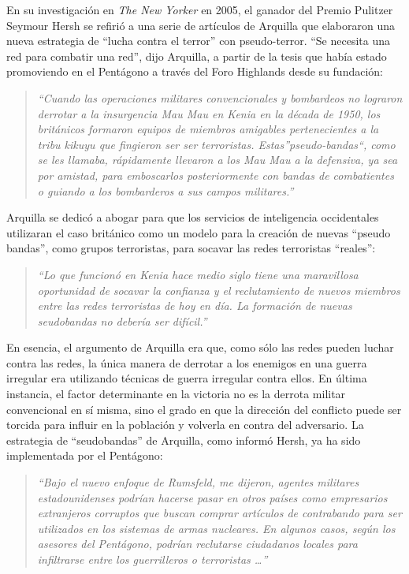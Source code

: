\documentclass[10pt,a5paper,twoside,spanish,]{book}
\begin{document}
En su investigación en \emph{The New Yorker} en 2005, el ganador del
Premio Pulitzer Seymour Hersh se refirió a una serie de artículos de
Arquilla que elaboraron una nueva estrategia de ``lucha contra el
terror'' con pseudo-terror. ``Se necesita una red para combatir una
red'', dijo Arquilla, a partir de la tesis que había estado promoviendo
en el Pentágono a través del Foro Highlands desde su fundación:

\begin{quote}
\emph{``Cuando las operaciones militares convencionales y bombardeos no
lograron derrotar a la insurgencia Mau Mau en Kenia en la década de
1950, los británicos formaron equipos de miembros amigables
pertenecientes a la tribu kikuyu que fingieron ser ser terroristas.
Estas''pseudo-bandas``, como se les llamaba, rápidamente llevaron a los
Mau Mau a la defensiva, ya sea por amistad, para emboscarlos
posteriormente con bandas de combatientes o guiando a los bombarderos a
sus campos militares.''}
\end{quote}

Arquilla se dedicó a abogar para que los servicios de inteligencia
occidentales utilizaran el caso británico como un modelo para la
creación de nuevas ``pseudo bandas'', como grupos terroristas, para
socavar las redes terroristas ``reales'':

\begin{quote}
\emph{``Lo que funcionó en Kenia hace medio siglo tiene una maravillosa
oportunidad de socavar la confianza y el reclutamiento de nuevos
miembros entre las redes terroristas de hoy en día. La formación de
nuevas seudobandas no debería ser difícil.''}
\end{quote}

En esencia, el argumento de Arquilla era que, como sólo las redes pueden
luchar contra las redes, la única manera de derrotar a los enemigos en
una guerra irregular era utilizando técnicas de guerra irregular contra
ellos. En última instancia, el factor determinante en la victoria no es
la derrota militar convencional en sí misma, sino el grado en que la
dirección del conflicto puede ser torcida para influir en la población y
volverla en contra del adversario. La estrategia de ``seudobandas'' de
Arquilla, como informó Hersh, ya ha sido implementada por el Pentágono:

\begin{quote}
\emph{``Bajo el nuevo enfoque de Rumsfeld, me dijeron, agentes militares
estadounidenses podrían hacerse pasar en otros países como empresarios
extranjeros corruptos que buscan comprar artículos de contrabando para
ser utilizados en los sistemas de armas nucleares. En algunos casos,
según los asesores del Pentágono, podrían reclutarse ciudadanos locales
para infiltrarse entre los guerrilleros o terroristas \ldots{}''}
\end{quote}
\end{document}
